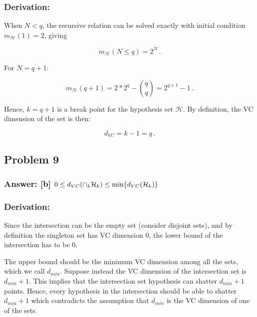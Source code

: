 \documentclass[11pt]{article}
\begin{document}
\hypertarget{derivation}{%
\subsubsection{Derivation:}\label{derivation}}

When \(N<q\), the recursive relation can be solved exactly with initial
condition \(m_{\mathcal{H}}(1)=2\), giving

\[
m_{\mathcal{H}}(N\le q)=2^N\,.
\]

For \(N=q+1\):

\[
m_{\mathcal{H}}(q+1)=2*2^{q}-{q\choose q}=2^{q+1}-1\,.
\]

Hence, \(k=q+1\) is a break point for the hypothesis set
\(\mathcal{H}\). By definition, the VC dimension of the set is then:

\[
d_{VC}=k-1=q\,.
\]

    \hypertarget{problem-9}{%
\subsection{Problem 9}\label{problem-9}}

\hypertarget{answer-b-0le-d_vccap_k-mathcalh_kle-rm-mind_vcmathcalh_k}{%
\subsubsection{\texorpdfstring{Answer: {[}b{]}
\(0\le d_{VC}(\cap_k \mathcal{H}_k)\le {\rm min}\{d_{VC}(\mathcal{H}_k)\}\)}{Answer: {[}b{]} 0\textbackslash{}le d\_\{VC\}(\textbackslash{}cap\_k \textbackslash{}mathcal\{H\}\_k)\textbackslash{}le \{\textbackslash{}rm min\}\textbackslash{}\{d\_\{VC\}(\textbackslash{}mathcal\{H\}\_k)\textbackslash{}\}}}\label{answer-b-0le-d_vccap_k-mathcalh_kle-rm-mind_vcmathcalh_k}}

\hypertarget{derivation}{%
\subsubsection{Derivation:}\label{derivation}}

Since the intersection can be the empty set (consider disjoint sets),
and by definition the singleton set has VC dimension 0, the lower bound
of the intersection has to be 0.

The upper bound should be the minimum VC dimension among all the sets,
which we call \(d_{min}\). Suppose instead the VC dimension of the
intersection set is \(d_{min}+1\). This implies that the intersection
set hypothesis can shatter \(d_{min}+1\) points. Hence, every hypothesis
in the intersection should be able to shatter \(d_{min}+1\) which
contradicts the assumption that \(d_{min}\) is the VC dimension of one
of the sets.
\end{document}

